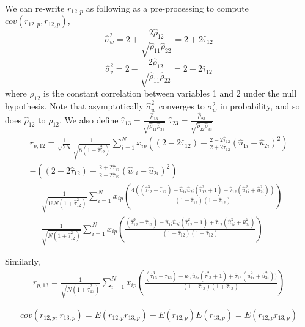 \documentclass[aap,authoryear, preprint]{imsart}
\numberwithin{equation}{section}
\theoremstyle{plain}
\begin{document}
We can re-write $r_{12,p}$ as following as a pre-processing to compute $cov(r_{12,p}, r_{12,p})$,
$$\hat{\sigma}_w^2 = 2 + \frac{2\hat{\rho}_{12}}{\sqrt{\hat{\rho}_{11}\hat{\rho}_{22}}} = 2+2\hat{\tau}_{12}$$
$$\hat{\sigma}_v^2 = 2 - \frac{2\hat{\rho}_{12}}{\sqrt{\hat{\rho}_{11}\hat{\rho}_{22}}} = 2-2\hat{\tau}_{12}$$
where $\rho_{12}$ is the constant correlation between variables 1 and 2 under the null hypothesis. Note that asymptotically $\hat{\sigma}_w^2$ converges to $\sigma_w^2$ in probability, and so does $\hat{\rho}_{12}$ to $\rho_{12}$. We also define
$\hat{\tau}_{13} = \frac{\hat{\rho}_{13}}{\sqrt{\hat{\rho}_{11}\hat{\rho}_{33}}}$
$\hat{\tau}_{23} = \frac{\hat{\rho}_{23}}{\sqrt{\hat{\rho}_{22}\hat{\rho}_{33}}}$
\begin{equation}
\begin{multlined}
    r_{p,12} = \frac{1}{\sqrt{2N}} \frac{1}{\sqrt{8(1 + \hat{\tau}_{12}^2)}}
    \sum_{i=1}^{N} x_{ip}\left( (2-2\hat{\tau}_{12})- \frac{2-2\hat{\tau}_{12}}{2+2\hat{\tau}_{12}}(\hat{u}_{1i}+\hat{u}_{2i})^2\right)\\  - \left( (2+2\hat{\tau}_{12}) - \frac{2+2\hat{\tau}_{12}}{2-2\hat{\tau}_{12}}(\hat{u}_{1i}-\hat{u}_{2i})^2\right)\\
    = \frac{1}{\sqrt{16N(1+\hat{\tau}_{12}^2)}} \sum_{i=1}^{N}x_{ip}
    \left( 
    \frac{4((\hat{\tau}_{12}^3 - \hat{\tau}_{12}) - \hat{u}_{1i}\hat{u}_{2i}(\hat{\tau}_{12}^2 + 1) + \hat{\tau}_{12}(\hat{u}_{1i}^2 + \hat{u}_{2i}^2))}{(1-\hat{\tau}_{12})(1+\hat{\tau}_{12})}
    \right)\\
    = \frac{1}{\sqrt{N(1+\hat{\tau}_{12}^2)}}\sum_{i=1}^{N}x_{ip} \left( 
    \frac{(\hat{\tau}_{12}^3 - \hat{\tau}_{12}) - \hat{u}_{1i}\hat{u}_{2i}(\hat{\tau}_{12}^2 + 1) + \hat{\tau}_{12}(\hat{u}_{1i}^2 + \hat{u}_{2i}^2)}{(1-\hat{\tau}_{12})(1+\hat{\tau}_{12})}
    \right)
\end{multlined}
\end{equation}

 Similarly,
\begin{align*}
    r_{p,13} = 
    \frac{1}{\sqrt{N(1+\hat{\tau}_{13}^2)}}\sum_{i=1}^{N}x_{ip} \left( 
    \frac{(\hat{\tau}_{13}^3 - \hat{\tau}_{13}) - \hat{u}_{1i}\hat{u}_{3i}(\hat{\tau}_{13}^2 + 1) + \hat{\tau}_{13}(\hat{u}_{1i}^2 + \hat{u}_{3i}^2))}{(1-\hat{\tau}_{13})(1+\hat{\tau}_{13})}
    \right)
\end{align*}

$$cov(r_{12,p}, r_{13,p}) = E(r_{12,p}r_{13,p}) - E(r_{12,p})E(r_{13,p}) = E(r_{12,p}r_{13,p})$$
\end{document}
